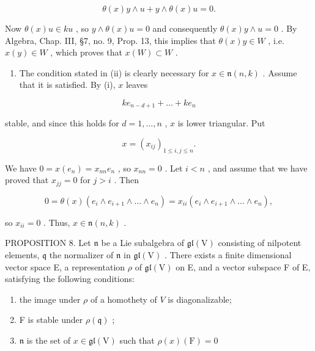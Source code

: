 \[
\theta (x) y \wedge u + y \wedge \theta (x) u = 0.
\]

Now \(\theta(x)u\in ku\) , so \(y\wedge\theta(x)u=0\) and consequently \(\theta(x)y\wedge u=0\) . By Algebra, Chap. III, §7, no. 9, Prop. 13, this implies that \(\theta(x)y\in W\) , i.e.~\(x(y)\in W\) , which proves that \(x(W)\subset W\) .

\begin{enumerate}
\def\labelenumi{(\roman{enumi})}
\setcounter{enumi}{1}
\tightlist
\item
  The condition stated in (ii) is clearly necessary for \(x \in \mathfrak{n}(n, k)\) . Assume that it is satisfied. By (i), \(x\) leaves
\end{enumerate}

\[
k e _ {n - d + 1} + \dots + k e _ {n}
\]

stable, and since this holds for \(d = 1, \ldots, n\) , \(x\) is lower triangular. Put

\[
x = (x _ {i j}) _ {1 \leq i, j \leq n}.
\]

We have \(0 = x(e_n) = x_{nn}e_n\) , so \(x_{nn} = 0\) . Let \(i < n\) , and assume that we have proved that \(x_{jj} = 0\) for \(j > i\) . Then

\[
0 = \theta (x) \left(e _ {i} \wedge e _ {i + 1} \wedge \dots \wedge e _ {n}\right) = x _ {i i} \left(e _ {i} \wedge e _ {i + 1} \wedge \dots \wedge e _ {n}\right),
\]

so \(x_{ii} = 0\) . Thus, \(x \in \mathfrak{n}(n,k)\) .

PROPOSITION 8. Let \(\mathfrak{n}\) be a Lie subalgebra of \(\mathfrak{gl}(\mathrm{V})\) consisting of nilpotent elements, \(\mathfrak{q}\) the normalizer of \(\mathfrak{n}\) in \(\mathfrak{gl}(\mathrm{V})\) . There exists a finite dimensional vector space E, a representation \(\rho\) of \(\mathfrak{gl}(\mathrm{V})\) on E, and a vector subspace F of E, satisfying the following conditions:

\begin{enumerate}
\def\labelenumi{(\roman{enumi})}
\item
  the image under \(\rho\) of a homothety of \(V\) is diagonalizable;
\item
  F is stable under \(\rho(\mathfrak{q})\) ;
\item
  \(\mathfrak{n}\) is the set of \(x\in \mathfrak{gl}(\mathrm{V})\) such that \(\rho (x)(\mathrm{F}) = 0\)
\end{enumerate}


